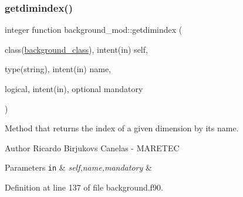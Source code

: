 \subsubsection{\texorpdfstring{getdimindex()}{getdimindex()}}
{\footnotesize\ttfamily integer function background\+\_\+mod\+::getdimindex (\begin{DoxyParamCaption}\item[{class(\mbox{\hyperlink{structbackground__mod_1_1background__class}{background\+\_\+class}}), intent(in)}]{self,  }\item[{type(string), intent(in)}]{name,  }\item[{logical, intent(in), optional}]{mandatory }\end{DoxyParamCaption})\hspace{0.3cm}{\ttfamily [private]}}



Method that returns the index of a given dimension by it\textquotesingle{}s name. 

\begin{DoxyAuthor}{Author}
Ricardo Birjukovs Canelas -\/ M\+A\+R\+E\+T\+EC 
\end{DoxyAuthor}

\begin{DoxyParams}[1]{Parameters}
\mbox{\tt in}  & {\em self,name,mandatory} & \\
\hline
\end{DoxyParams}


Definition at line 137 of file background.\+f90.


